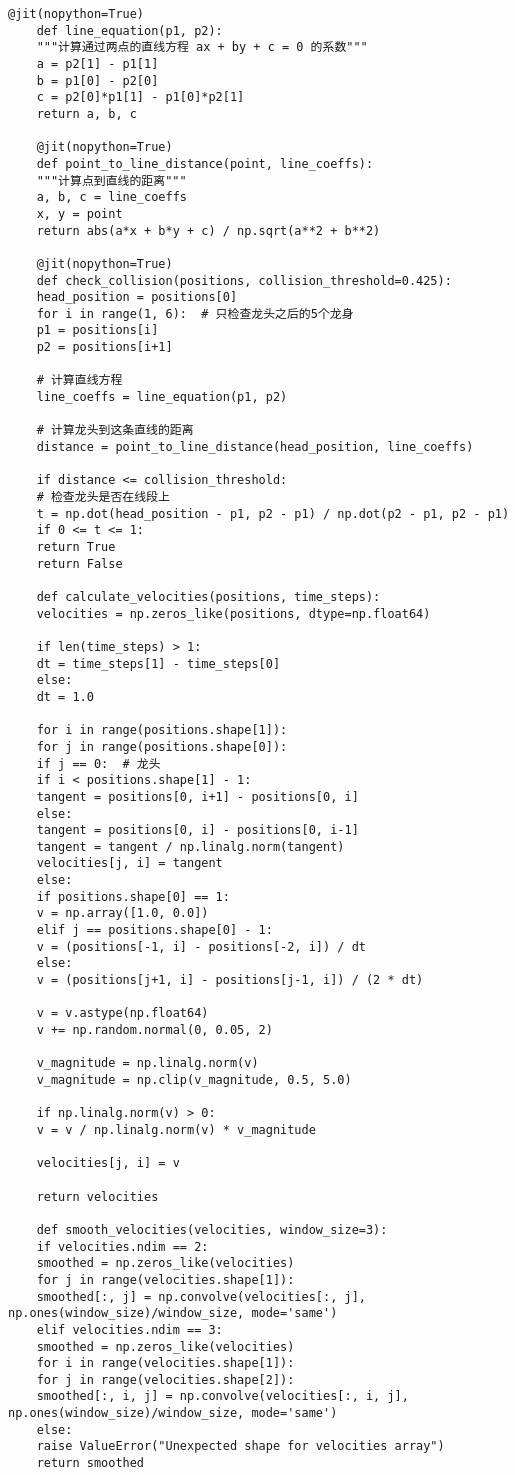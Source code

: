 \begin{lstlisting}[caption={问题二处理代码1}]
	@jit(nopython=True)
	def line_equation(p1, p2):
	"""计算通过两点的直线方程 ax + by + c = 0 的系数"""
	a = p2[1] - p1[1]
	b = p1[0] - p2[0]
	c = p2[0]*p1[1] - p1[0]*p2[1]
	return a, b, c
	
	@jit(nopython=True)
	def point_to_line_distance(point, line_coeffs):
	"""计算点到直线的距离"""
	a, b, c = line_coeffs
	x, y = point
	return abs(a*x + b*y + c) / np.sqrt(a**2 + b**2)
	
	@jit(nopython=True)
	def check_collision(positions, collision_threshold=0.425):
	head_position = positions[0]
	for i in range(1, 6):  # 只检查龙头之后的5个龙身
	p1 = positions[i]
	p2 = positions[i+1]
	
	# 计算直线方程
	line_coeffs = line_equation(p1, p2)
	
	# 计算龙头到这条直线的距离
	distance = point_to_line_distance(head_position, line_coeffs)
	
	if distance <= collision_threshold:
	# 检查龙头是否在线段上
	t = np.dot(head_position - p1, p2 - p1) / np.dot(p2 - p1, p2 - p1)
	if 0 <= t <= 1:
	return True
	return False
	
	def calculate_velocities(positions, time_steps):
	velocities = np.zeros_like(positions, dtype=np.float64)
	
	if len(time_steps) > 1:
	dt = time_steps[1] - time_steps[0]
	else:
	dt = 1.0
	
	for i in range(positions.shape[1]):
	for j in range(positions.shape[0]):
	if j == 0:  # 龙头
	if i < positions.shape[1] - 1:
	tangent = positions[0, i+1] - positions[0, i]
	else:
	tangent = positions[0, i] - positions[0, i-1]
	tangent = tangent / np.linalg.norm(tangent)
	velocities[j, i] = tangent
	else:
	if positions.shape[0] == 1:
	v = np.array([1.0, 0.0])
	elif j == positions.shape[0] - 1:
	v = (positions[-1, i] - positions[-2, i]) / dt
	else:
	v = (positions[j+1, i] - positions[j-1, i]) / (2 * dt)
	
	v = v.astype(np.float64)
	v += np.random.normal(0, 0.05, 2)
	
	v_magnitude = np.linalg.norm(v)
	v_magnitude = np.clip(v_magnitude, 0.5, 5.0)
	
	if np.linalg.norm(v) > 0:
	v = v / np.linalg.norm(v) * v_magnitude
	
	velocities[j, i] = v
	
	return velocities
	
	def smooth_velocities(velocities, window_size=3):
	if velocities.ndim == 2:
	smoothed = np.zeros_like(velocities)
	for j in range(velocities.shape[1]):
	smoothed[:, j] = np.convolve(velocities[:, j], np.ones(window_size)/window_size, mode='same')
	elif velocities.ndim == 3:
	smoothed = np.zeros_like(velocities)
	for i in range(velocities.shape[1]):
	for j in range(velocities.shape[2]):
	smoothed[:, i, j] = np.convolve(velocities[:, i, j], np.ones(window_size)/window_size, mode='same')
	else:
	raise ValueError("Unexpected shape for velocities array")
	return smoothed
	

\end{lstlisting}
